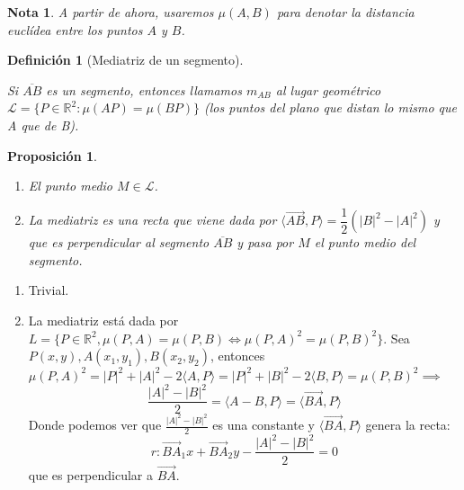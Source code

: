 \documentclass[11pt, a4paper]{article}
\makeatletter
\newif\IfInSansMode
\let\oldsf\sffamily
\renewcommand*{\sffamily}{\oldsf\mathversion{sans}\InSansModetrue}
\let\oldnorm\normalfont
\renewcommand*{\normalfont}{\oldnorm\InSansModefalse\mathversion{normal}}
\renewenvironment{proof}[1][\proofname] {\vspace{-15pt}\par\pushQED{\qed}\normalfont\topsep6\p@\@plus6\p@\relax\trivlist\item[\hskip\labelsep\it#1\@addpunct{.}]\ignorespaces}{\popQED\endtrivlist\@endpefalse}
\newcommand{\R}{\mathbb{R}}
\renewcommand{\vec}{\overrightarrow}
\renewenvironment{proof}[1][\proofname] {\par\pushQED{\qed}\normalfont\topsep6\p@\@plus6\p@\relax\trivlist\item[\hskip\labelsep\itshape\sffamily#1\@addpunct{.}]\ignorespaces}{\popQED\endtrivlist\@endpefalse}
\theoremstyle{theorem-style}
\newtheorem{nprop}{Proposición}[section]
\theoremstyle{definition-style}
\newtheorem{ndef}{Definición}[section]
\theoremstyle{remark-style}
\newtheorem*{nota}{Nota}
\theoremstyle{example-style}
\newenvironment{nlist}
{\begin{enumerate}
    \renewcommand\labelenumi{(\emph{\roman{enumi})}}}
  {\end{enumerate}}
\makeatother
\begin{document}
\begin{nota}
  A partir de ahora, usaremos $\mu(A,B)$ para denotar la distancia euclídea entre los puntos $A$ y $B$.
\end{nota}

\begin{ndef}[Mediatriz de un segmento] \hfill\\
\begin{minipage}[c]{0.70\textwidth}
  Si $\overline{AB}$ es un segmento, entonces llamamos $m_{AB}$  al lugar geométrico $\mathcal{L}=\{P \in \R^2 : \mu(AP) = \mu(BP)\}$ (los puntos del plano que distan lo mismo que A que de B).
\end{minipage}
\begin{minipage}[]{0.27\textwidth}
  \begin{center}
  \sffamily
\end{center}
\end{minipage}
\end{ndef}

\begin{nprop}\hfill
  \begin{nlist}
    \item El punto medio $M \in \mathcal{L}$. 
    \item La mediatriz es una recta que viene dada por $\langle\vec{AB},P\rangle  = \dfrac{1}{2}(|B|^2-|A|^2)$ y que es perpendicular al segmento $\overline{AB}$ y pasa por $M$ el punto medio del segmento.
  \end{nlist}
\end{nprop}

\begin{proof}\hfill
  \begin{nlist}
    \item Trivial.
    \item La mediatriz está dada por $L = \{P\in\mathbb{R}^2, \mu(P,A) = \mu(P,B)\iff \mu(P,A)^2 = \mu(P,B)^2\}$. Sea $P(x,y),A(x_1,y_1),B(x_2,y_2)$, entonces $\mu(P,A)^2 = |P|^2+|A|^2-2\langle A,P\rangle  = |P|^2+|B|^2-2\langle B,P\rangle = \mu(P,B)^2 \implies$ $$ \frac{|A|^2-|B|^2}{2} =\langle A-B,P\rangle  = \langle\vec{BA},P\rangle $$
    Donde podemos ver que $\frac{|A|^2-|B|^2}{2}$ es una constante y $\langle\vec{BA},P\rangle $ genera la recta:
    \[
      r: \vec{BA}_1x+ \vec{BA}_2y - \frac{|A|^2-|B|^2}{2} = 0
    \]
    que es perpendicular a $\vec{BA}$.
  \end{nlist}
\end{proof}
\end{document}
